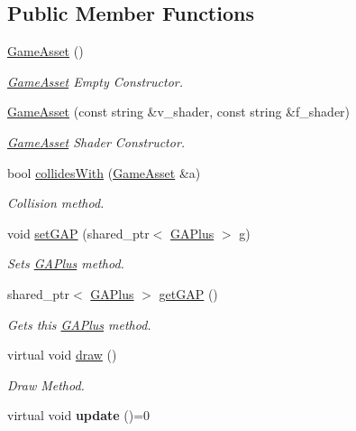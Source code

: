 \subsection*{Public Member Functions}
\begin{DoxyCompactItemize}
\item 
\hyperlink{classGameAsset_a9c96b0bafa2b6973a2e8c09bf51c52ec}{Game\-Asset} ()
\begin{DoxyCompactList}\small\item\em \hyperlink{classGameAsset}{Game\-Asset} Empty Constructor. \end{DoxyCompactList}\item 
\hyperlink{classGameAsset_ac6d2340f41dd95e71892327dae4e1585}{Game\-Asset} (const string \&v\-\_\-shader, const string \&f\-\_\-shader)
\begin{DoxyCompactList}\small\item\em \hyperlink{classGameAsset}{Game\-Asset} Shader Constructor. \end{DoxyCompactList}\item 
bool \hyperlink{classGameAsset_a612793ce2a354d2f8839a779d0ca2227}{collides\-With} (\hyperlink{classGameAsset}{Game\-Asset} \&a)
\begin{DoxyCompactList}\small\item\em Collision method. \end{DoxyCompactList}\item 
void \hyperlink{classGameAsset_aa4e2e9faf5cc690677549cbaf30ab80a}{set\-G\-A\-P} (shared\-\_\-ptr$<$ \hyperlink{classGAPlus}{G\-A\-Plus} $>$ g)
\begin{DoxyCompactList}\small\item\em Sets \hyperlink{classGAPlus}{G\-A\-Plus} method. \end{DoxyCompactList}\item 
\hypertarget{classGameAsset_a4d64bc9652249a4d5512b52432b8154a}{shared\-\_\-ptr$<$ \hyperlink{classGAPlus}{G\-A\-Plus} $>$ \hyperlink{classGameAsset_a4d64bc9652249a4d5512b52432b8154a}{get\-G\-A\-P} ()}\label{classGameAsset_a4d64bc9652249a4d5512b52432b8154a}

\begin{DoxyCompactList}\small\item\em Gets this \hyperlink{classGAPlus}{G\-A\-Plus} method. \end{DoxyCompactList}\item 
virtual void \hyperlink{classGameAsset_a2d7e18a8f1dd8ba89ed1bd14f2affeab}{draw} ()
\begin{DoxyCompactList}\small\item\em Draw Method. \end{DoxyCompactList}\item 
\hypertarget{classGameAsset_a42688ec8f02e201eaaa01e74a112083f}{virtual void {\bfseries update} ()=0}\label{classGameAsset_a42688ec8f02e201eaaa01e74a112083f}


\end{DoxyCompactItemize}
